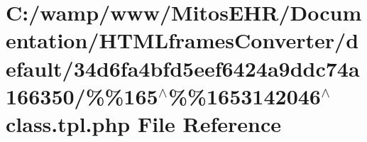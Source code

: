 \hypertarget{default_234d6fa4bfd5eef6424a9ddc74a166350_2_06_06165_05_06_061653142046_05class_8tpl_8php}{\section{\-C\-:/wamp/www/\-Mitos\-E\-H\-R/\-Documentation/\-H\-T\-M\-Lframes\-Converter/default/34d6fa4bfd5eef6424a9ddc74a166350/\%\%165$^\wedge$\%\%1653142046$^\wedge$class.tpl.\-php \-File \-Reference}
\label{default_234d6fa4bfd5eef6424a9ddc74a166350_2_06_06165_05_06_061653142046_05class_8tpl_8php}
}
